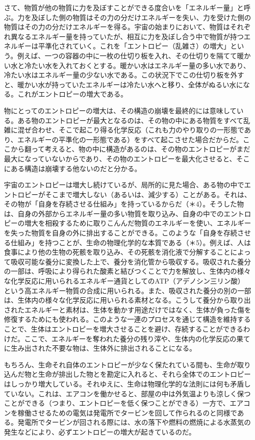 \documentclass[
]{ltjsarticle}
\begin{document}
さて、物質が他の物質に力を及ぼすことができる度合いを「エネルギー量」と呼ぶ。力を及ぼした側の物質はその力の分だけエネルギーを失い、力を受けた側の物質はその力の分だけエネルギーを得る。宇宙の始まりにおいて、物質はそれぞれ異なるエネルギー量を持っていたが、相互に力を及ぼし合う中で物質が持つエネルギーは平準化されていく。これを「エントロピー（乱雑さ）の増大」という。例えば、一つの容器の中に一枚の仕切り板を入れ、その仕切りを隔てて暖かい水と冷たい水を入れておくとする。暖かい水はエネルギー量の多い水であり、冷たい水はエネルギー量の少ない水である。この状況下でこの仕切り板を外すと、暖かい水が持っていたエネルギーは冷たい水へと移り、全体がぬるい水になる。これがエントロピーの増大である。

物にとってのエントロピーの増大は、その構造の崩壊を最終的には意味している。ある物のエントロピーが最大となるのは、その物の中にある物質をすべて乱雑に混ぜ合わせ、そこで起こり得る化学反応（これも力のやり取りの一形態であり、エネルギーの平準化の一形態である）をすべて起こさせた場合だからだ。ここから翻って考えると、物の中に構造があるのは、その物のエントロピーがまだ最大になっていないからであり、その物のエントロピーを最大化させると、そこにある構造は崩壊する他ないのだと分かる。

宇宙のエントロピーは増大し続けているが、局所的に見た場合、ある物の中でエントロピーがそこまで増大しない（あるいは、減少する）ことがある。それは、その物が「自身を存続させる仕組み」を持っているからだ（＊4）。そうした物は、自身の外部からエネルギー量の多い物質を取り込み、自身の中でのエントロピーの増大を相殺するために取りこんんだ物質のエネルギーを使い、エネルギーを失った物質を自身の外に排出することができる。このような「自身を存続させる仕組み」を持つことが、生命の物理化学的な本質である（＊5）。例えば、人は食事により他の生物の死骸を取り込み、その死骸を消化液で分解することによって吸収可能な養分に変換した上で、養分を消化管から吸収する。吸収された養分の一部は、呼吸により得られた酸素と結びつくことで力を解放し、生体内の様々な化学反応に用いられるエネルギー通貨としてのATP（アデノシン三リン酸）という高エネルギー物質の合成に用いられる。また、吸収された養分の別の一部は、生体内の様々な化学反応に用いられる素材となる。こうして養分から取り出されたエネルギーと素材は、生体を動かす用途だけではなく、生体が負った傷を修復するためにも使われる。このような一連のプロセスを通じて構造を維持することで、生体はエントロピーを増大させることを避け、存続することができるわけだ。ここで、エネルギーを奪われた養分の残り滓や、生体内の化学反応の果てに生み出された不要な物は、生体外に排出されることになる。

もちろん、生命それ自体のエントロピーが少なく保たれている間も、生命が取り込んだ物と生命が排出した物とを勘定に入れると、それら全体でのエントロピーはしっかり増大している。それゆえに、生命は物理化学的な法則には何も矛盾していない。これは、エアコンを働かせると、部屋の中は外気温よりも涼しく保つことができる（つまり、エントロピーを低く保つことができる）一方で、エアコンを稼働させるための電気は発電所でタービンを回して作られるのと同様である。発電所でタービンが回される際には、水の落下や燃料の燃焼による水蒸気の発生などにより、必ずエントロピーの増大が起きているのだ。
\end{document}

